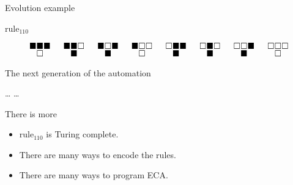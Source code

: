 \documentclass[presentation,aspectratio=169,smaller]{beamer}
\begin{document}
\begin{frame}[label={sec:org812e2ea},t]{Evolution example}
\begin{onlyenv}
\(\text{rule}_{110}\)

\begin{equation*}
  \begingroup
  \setlength\arraycolsep{0.25pt}
  \renewcommand{\arraystretch}{0.5}
  \begin{matrix}
    \blacksquare & \blacksquare & \blacksquare \\
    & \square &
  \end{matrix}\mspace{28mu}
  \begin{matrix}
    \blacksquare & \blacksquare & \square \\
    & \blacksquare &
  \end{matrix}\mspace{28mu}
  \begin{matrix}
    \blacksquare & \square & \blacksquare \\
    & \blacksquare &
  \end{matrix}\mspace{28mu}
  \begin{matrix}
    \blacksquare & \square & \square \\
    & \square &
  \end{matrix}\mspace{28mu}
  \begin{matrix}
    \square & \blacksquare & \blacksquare \\
    & \blacksquare &
  \end{matrix}\mspace{28mu}
  \begin{matrix}
    \square & \blacksquare & \square \\
    & \blacksquare &
  \end{matrix}\mspace{28mu}
  \begin{matrix}
    \square & \square & \blacksquare \\
    & \blacksquare &
  \end{matrix}\mspace{28mu}
  \begin{matrix}
    \square & \square & \square \\
    & \square &
  \end{matrix}
  \endgroup
\end{equation*}

The next generation of the automation

\hfill \dots
\blacksquare
\blacksquare
\blacksquare
\square
\square
\square
\blacksquare
\dots \hfill
\end{onlyenv}
\end{frame}

\begin{frame}[label={sec:orgbd45cea}]{There is more}
\begin{itemize}
\item \(\text{rule}_{110}\) is Turing complete.
\item There are many ways to encode the rules.
\item There are many ways to program ECA.
\end{itemize}
\end{frame}
\end{document}
